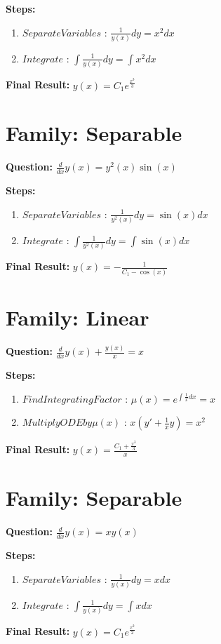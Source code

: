 \documentclass{article}
\begin{document}
\textbf{Steps:}
\begin{enumerate}
\item $Separate Variables$ :  $\frac{1}{y{\left(x \right)}} dy = x^{2} dx$
\item $Integrate$ :  $\int \frac{1}{y{\left(x \right)}} dy = \int x^{2} dx$
\end{enumerate}
\textbf{Final Result:} $y{\left(x \right)} = C_{1} e^{\frac{x^{3}}{3}}$

\section*{Family: Separable}
\textbf{Question:} $\frac{d}{d x} y{\left(x \right)} = y^{2}{\left(x \right)} \sin{\left(x \right)}$

\textbf{Steps:}
\begin{enumerate}
\item $Separate Variables$ :  $\frac{1}{y^{2}{\left(x \right)}} dy = \sin{\left(x \right)} dx$
\item $Integrate$ :  $\int \frac{1}{y^{2}{\left(x \right)}} dy = \int \sin{\left(x \right)} dx$
\end{enumerate}
\textbf{Final Result:} $y{\left(x \right)} = - \frac{1}{C_{1} - \cos{\left(x \right)}}$

\section*{Family: Linear}
\textbf{Question:} $\frac{d}{d x} y{\left(x \right)} + \frac{y{\left(x \right)}}{x} = x$

\textbf{Steps:}
\begin{enumerate}
\item $Find Integrating Factor$ :  $\mu(x) = e^{\int \frac{1}{x} dx} = x$
\item $Multiply ODE by \mu(x)$ :  $x(y' + \frac{1}{x}y) = x^{2}$
\end{enumerate}
\textbf{Final Result:} $y{\left(x \right)} = \frac{C_{1} + \frac{x^{3}}{3}}{x}$

\section*{Family: Separable}
\textbf{Question:} $\frac{d}{d x} y{\left(x \right)} = x y{\left(x \right)}$

\textbf{Steps:}
\begin{enumerate}
\item $Separate Variables$ :  $\frac{1}{y{\left(x \right)}} dy = x dx$
\item $Integrate$ :  $\int \frac{1}{y{\left(x \right)}} dy = \int x dx$
\end{enumerate}
\textbf{Final Result:} $y{\left(x \right)} = C_{1} e^{\frac{x^{2}}{2}}$
\end{document}
